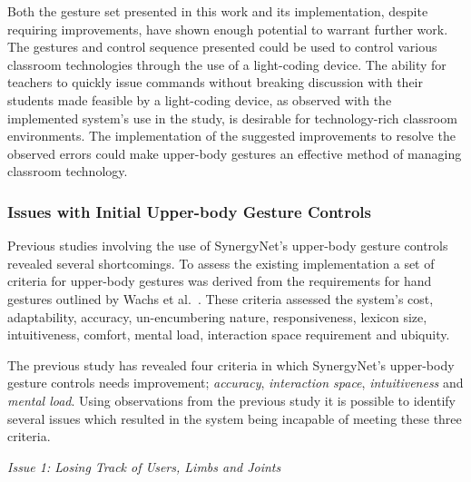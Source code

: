 \documentclass[link]{IWCOMP}
\begin{document}
Both the gesture set presented in this work and its implementation, despite requiring improvements, have shown enough potential to warrant further work.
The gestures and control sequence presented could be used to control various classroom technologies through the use of a light-coding device.
The ability for teachers to quickly issue commands without breaking discussion with their students made feasible by a light-coding device, as observed with the implemented system's use in the study, is desirable for technology-rich classroom environments.
The implementation of the suggested improvements to resolve the observed errors could make upper-body gestures an effective method of managing classroom technology.




\subsubsection{Issues with Initial Upper-body Gesture Controls}
\label{subsubsec:studyPhase1ObservationsIssues}

Previous studies involving the use of SynergyNet's upper-body gesture controls revealed several shortcomings.
To assess the existing implementation a set of criteria for upper-body gestures was derived from the requirements for hand gestures outlined by Wachs et al.~\cite{Wachs2011}.
These criteria assessed the system's cost, adaptability, accuracy, un-encumbering nature, responsiveness, lexicon size, intuitiveness, comfort, mental load, interaction space requirement and ubiquity.

The previous study has revealed four criteria in which SynergyNet's upper-body gesture controls needs improvement; 
\textit{accuracy}, \textit{interaction space}, \textit{intuitiveness} and \textit{mental load}.
Using observations from the previous study it is possible to identify several issues which resulted in the system being incapable of meeting these three criteria.

\emph{Issue 1: Losing Track of Users, Limbs and Joints}
\end{document}
